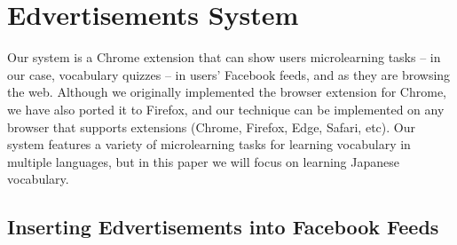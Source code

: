 \documentclass{sigchi}
\begin{document}




\section{Edvertisements System}

Our system is a Chrome extension that can show users microlearning tasks -- in our case, vocabulary quizzes -- in users' Facebook feeds, and as they are browsing the web. Although we originally implemented the browser extension for Chrome, we have also ported it to Firefox, and our technique can be implemented on any browser that supports extensions (Chrome, Firefox, Edge, Safari, etc). Our system features a variety of microlearning tasks for learning vocabulary in multiple languages, but in this paper we will focus on learning Japanese vocabulary.



\subsection{Inserting Edvertisements into Facebook Feeds}
\end{document}
